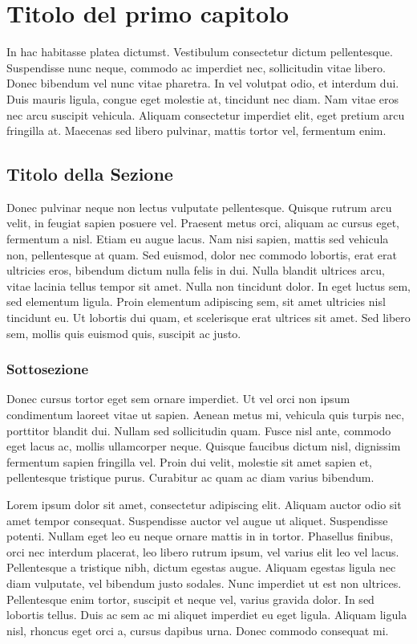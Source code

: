 \documentclass[target=mst,aauheader=,style=]{thud}
\begin{document}
\chapter{Titolo del primo capitolo}
In hac habitasse platea dictumst. Vestibulum consectetur dictum pellentesque. Suspendisse nunc neque, commodo ac imperdiet nec, sollicitudin vitae libero. Donec bibendum vel nunc vitae pharetra. In vel volutpat odio, et interdum dui. Duis mauris ligula, congue eget molestie at, tincidunt nec diam. Nam vitae eros nec arcu suscipit vehicula. Aliquam consectetur imperdiet elit, eget pretium arcu fringilla at. Maecenas \cite{Knu86} sed libero pulvinar, mattis tortor vel, fermentum enim.

\section{Titolo della Sezione}
Donec pulvinar neque non lectus vulputate pellentesque. Quisque rutrum arcu velit, in feugiat sapien posuere vel. Praesent metus orci, aliquam ac cursus eget, fermentum a nisl. Etiam eu augue lacus. Nam nisi sapien, mattis sed vehicula non, pellentesque at quam. Sed euismod, dolor nec commodo lobortis, erat erat ultricies eros, bibendum dictum nulla felis in dui. Nulla blandit ultrices arcu, vitae lacinia tellus tempor sit amet. Nulla non tincidunt dolor. In eget luctus sem, sed elementum ligula. Proin elementum adipiscing sem, sit amet ultricies nisl tincidunt eu. Ut lobortis dui quam, et scelerisque erat ultrices sit amet. Sed libero sem, mollis quis euismod quis, suscipit ac justo.

\subsection{Sottosezione}
Donec cursus tortor eget sem ornare imperdiet. Ut vel orci non ipsum condimentum laoreet vitae ut sapien. Aenean metus mi, vehicula quis turpis nec, porttitor blandit dui. Nullam sed sollicitudin quam. Fusce nisl ante, commodo eget lacus ac, mollis ullamcorper neque. Quisque faucibus dictum nisl, dignissim fermentum sapien fringilla vel. Proin dui velit, molestie sit amet sapien et, pellentesque tristique purus. Curabitur ac quam ac diam varius bibendum.

Lorem ipsum dolor sit amet, consectetur adipiscing elit. Aliquam auctor odio sit amet tempor consequat. Suspendisse auctor vel augue ut aliquet. Suspendisse potenti. Nullam eget leo eu neque ornare mattis in in tortor. Phasellus finibus, orci nec interdum placerat, leo libero rutrum ipsum, vel varius elit leo vel lacus. Pellentesque a tristique nibh, dictum egestas augue. Aliquam egestas ligula nec diam vulputate, vel bibendum justo sodales. Nunc imperdiet ut est non ultrices. Pellentesque enim tortor, suscipit et neque vel, varius gravida dolor. In sed lobortis tellus. Duis ac sem ac mi aliquet imperdiet eu eget ligula. Aliquam ligula nisl, rhoncus eget orci a, cursus dapibus urna. Donec commodo consequat mi.
\end{document}
